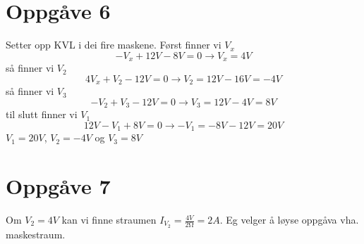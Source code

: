 \documentclass[12pt,a4paper]{article}
\begin{document}
    \section{Oppgåve 6}
      Setter opp KVL i dei fire maskene. Først finner vi $V_x$
      \begin{equation}
        -V_x +12V - 8V = 0 \rightarrow V_x = 4V
      \end{equation}
      så finner vi $V_2$
      \begin{equation}
        4V_x +V_2 -12V = 0 \rightarrow V_2 = 12V-16V =-4V
      \end{equation}
      så finner vi $V_3$
      \begin{equation}
        -V_2 +V_3 -12V = 0 \rightarrow V_3 = 12V-4V=8V
      \end{equation}
      til slutt finner vi $V_1$
      \begin{equation}
        12V - V_1 +8V=0 \rightarrow -V_1 = -8V-12V=20V
      \end{equation}
       $V_1 = 20V$, $V_2 = -4V$ og $V_3 = 8V$

    \newpage

    \section{Oppgåve 7}
      Om $V_2 = 4V$ kan vi finne straumen $I_{V_2}=\frac{4V}{2\si{\ohm}}=2A$. Eg velger
      å løyse oppgåva vha. maskestraum.
\end{document}
